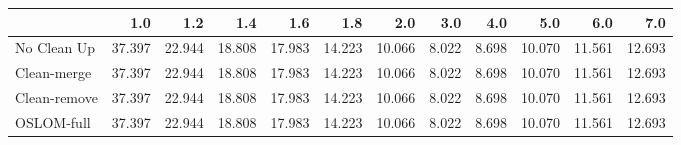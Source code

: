 \begin{tabular}{lrrrrrrrrrrr}
\toprule
{} &    1.0 &    1.2 &    1.4 &    1.6 &    1.8 &    2.0 &   3.0 &   4.0 &    5.0 &    6.0 &    7.0 \\
\midrule
No Clean Up  & 37.397 & 22.944 & 18.808 & 17.983 & 14.223 & 10.066 & 8.022 & 8.698 & 10.070 & 11.561 & 12.693 \\
Clean-merge  & 37.397 & 22.944 & 18.808 & 17.983 & 14.223 & 10.066 & 8.022 & 8.698 & 10.070 & 11.561 & 12.693 \\
Clean-remove & 37.397 & 22.944 & 18.808 & 17.983 & 14.223 & 10.066 & 8.022 & 8.698 & 10.070 & 11.561 & 12.693 \\
OSLOM-full   & 37.397 & 22.944 & 18.808 & 17.983 & 14.223 & 10.066 & 8.022 & 8.698 & 10.070 & 11.561 & 12.693 \\
\bottomrule
\end{tabular}
